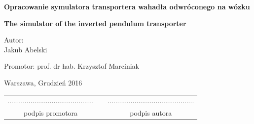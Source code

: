 \documentclass[12pt, twoside, openany]{report}
\theoremstyle{definition}
\begin{document}
\begin{titlepage}
\linespread{1.5}
\begin{center}
\Huge
\textbf{Opracowanie symulatora transportera wahadła odwróconego na wózku}
\end{center}

\begin{center}
\Large
\textbf{The simulator of the inverted pendulum transporter}
\end{center}


\vfill
\begin{center}
\Large
Autor:\\
\LARGE Jakub Abelski
\end{center}
\vfill
\begin{center}
\Large
Promotor: prof. dr hab. Krzysztof Marciniak
\end{center}
\vfill
\begin{center}
\large
Warszawa, Grudzień 2016
\end{center}

\newpage
\hfill
\begin{table}[b]
\centering
\begin{tabular}[t]{ccc}
............................................. & \hspace*{100pt} & .............................................\\
podpis promotora & \hspace*{100pt} & podpis autora
\end{tabular}
\end{table}
\end{titlepage}

\setlength{\parindent}{5ex}
\end{document}
